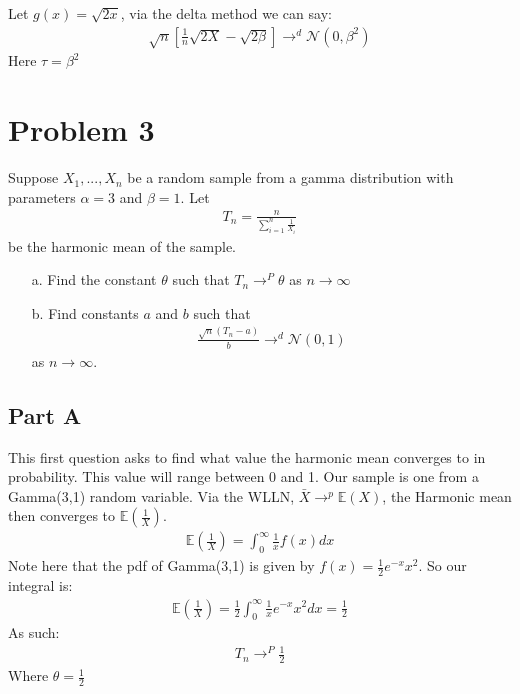 \documentclass{article}
\begin{document}
Let $g(x)=\sqrt{2x}$, via the delta method we can say:
\begin{align*}
\boxed{ \sqrt{n}[\frac{1}{n}\sqrt{2X}-\sqrt{2\beta}] \rightarrow^d \mathcal{N}(0,\beta^2) }
\end{align*}
Here $\tau=\beta^2$

\clearpage

\section*{Problem 3}
 Suppose $X_1,..., X_n$ be a random sample from a gamma distribution with parameters $\alpha = 3$ and $\beta = 1$. Let
 \begin{align*}
 T_n = \frac{n}{\sum_{i=1}^{n}\tfrac{1}{X_i}}
 \end{align*}
 be the harmonic mean of the sample.
 \begin{enumerate}
 \item[a.] Find the constant $\theta$ such that $T_n \rightarrow^P \theta$ as $n\rightarrow \infty$
 \item[b.] Find constants $a$ and $b$ such that
 \begin{align*}
 \frac{\sqrt{n}(T_n-a)}{b} \rightarrow^d \mathcal{N}(0,1)
 \end{align*}
 as $n\rightarrow \infty$.
 \end{enumerate}
\subsection*{Part A}
This first question asks to find what value the harmonic mean converges to in probability. This value will range between 0 and 1. Our sample is one from a Gamma(3,1) random variable. Via the WLLN, $\bar{X} \rightarrow^p \mathbb{E}(X)$, the Harmonic mean then converges to $\mathbb{E}(\frac{1}{X})$.
\begin{align*}
\mathbb{E}(\tfrac{1}{X}) = \int_{0}^{\infty} \frac{1}{x} f(x) dx
\end{align*}
Note here that the pdf of Gamma(3,1) is given by $f(x)=\tfrac{1}{2}e^{-x}x^2$. So our integral is:
\begin{align*}
\mathbb{E}(\tfrac{1}{X}) = \tfrac{1}{2} \int_{0}^{\infty} \frac{1}{x} e^{-x}x^2 dx = \frac{1}{2}
\end{align*}
As such:
\begin{align*}
\boxed{ T_n \rightarrow^P \frac{1}{2} }
\end{align*}
Where $\theta=\frac{1}{2}$
\end{document}

